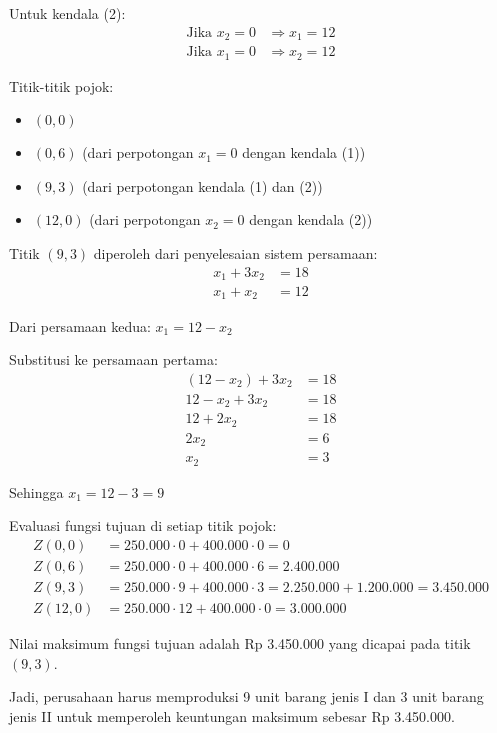 \documentclass[12pt,a4paper]{article}
\begin{document}
\begin{enumerate}
    Untuk kendala (2):
    \begin{align*}
    \text{Jika } x_2 = 0 &\Rightarrow x_1 = 12\\  
    \text{Jika } x_1 = 0 &\Rightarrow x_2 = 12
    \end{align*}
    
    Titik-titik pojok:
    \begin{itemize}
        \item $(0,0)$
        \item $(0,6)$ (dari perpotongan $x_1 = 0$ dengan kendala (1))
        \item $(9,3)$ (dari perpotongan kendala (1) dan (2))
        \item $(12,0)$ (dari perpotongan $x_2 = 0$ dengan kendala (2))
    \end{itemize}
    
    Titik $(9,3)$ diperoleh dari penyelesaian sistem persamaan:
    \begin{align*}
    x_1 + 3x_2 &= 18\\  
    x_1 + x_2 &= 12
    \end{align*}
    
    Dari persamaan kedua: $x_1 = 12 - x_2$
    
    Substitusi ke persamaan pertama:
    \begin{align*}
    (12 - x_2) + 3x_2 &= 18\\  
    12 - x_2 + 3x_2 &= 18\\  
    12 + 2x_2 &= 18\\  
    2x_2 &= 6\\  
    x_2 &= 3
    \end{align*}
    
    Sehingga $x_1 = 12 - 3 = 9$
    
    Evaluasi fungsi tujuan di setiap titik pojok:
    \begin{align*}
    Z(0,0) &= 250.000 \cdot 0 + 400.000 \cdot 0 = 0\\  
    Z(0,6) &= 250.000 \cdot 0 + 400.000 \cdot 6 = 2.400.000\\  
    Z(9,3) &= 250.000 \cdot 9 + 400.000 \cdot 3 = 2.250.000 + 1.200.000 = 3.450.000\\  
    Z(12,0) &= 250.000 \cdot 12 + 400.000 \cdot 0 = 3.000.000
    \end{align*}
    
    Nilai maksimum fungsi tujuan adalah Rp 3.450.000 yang dicapai pada titik $(9,3)$.
    
    Jadi, perusahaan harus memproduksi 9 unit barang jenis I dan 3 unit barang jenis II untuk memperoleh keuntungan maksimum sebesar Rp 3.450.000.
    

\end{enumerate}
\end{document}
